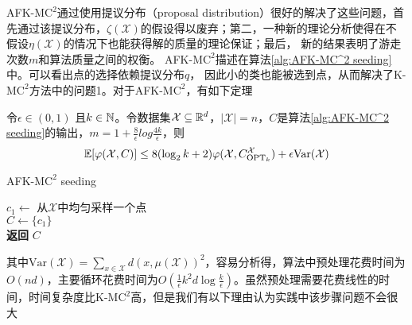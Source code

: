 AFK-M$\text{C}^2$通过使用提议分布（proposal distribution）很好的解决了这些问题，首先通过该提议分布，$\zeta(\mathcal{X})$的假设得以废弃；第二，一种新的理论分析使得在不假设$\eta(\mathcal{X})$的情况下也能获得解的质量的理论保证；最后， 新的结果表明了游走次数$m$和算法质量之间的权衡。 AFK-M$\text{C}^2$描述在算法\ref{alg:AFK-MC^2 seeding}中。可以看出点的选择依赖提议分布$q$， 因此小的类也能被选到点，从而解决了K-M$\text{C}^2$方法中的问题1。对于AFK-M$\text{C}^2$，有如下定理
\begin{theorem}
    \label{theo:AFKmc^2 performance}
    令$\epsilon \in (0,1)$ 且$k \in \mathbb{N}$。令数据集$\mathcal{X} \subseteq \mathbb{R}^d$，$|\mathcal{X}| = n$，$C$是算法\ref{alg:AFK-MC^2 seeding}的输出，$m = 1+\frac{8}{\epsilon}log \frac{4k}{\epsilon}$，则
    \begin{equation}
    \mathbb{E}[\varphi(\mathcal{X},C)]\leq 8(\log_{2}k+2)\varphi(\mathcal{X},C_{\text{OPT}_k}^{\mathcal{X}}) + \epsilon\text{Var}(\mathcal{X})
    \end{equation}
\end{theorem}
\begin{algorithm}
    \SetNoFillComment
    \caption{AFK-M$\text{C}^2$ seeding}\label{alg:AFK-MC^2 seeding}
    $c_1 \gets $ 从$\mathcal{X}$中均匀采样一个点 \\
    $C \gets \{c_1\}$ \\
    \textbf{返回} $C$
\end{algorithm}
其中$\text{Var}(\mathcal{X})=\sum_{x \in  \mathcal{X}}d(x,\mu(\mathcal{X}))^2$，容易分析得，算法中预处理花费时间为$O(nd)$，主要循环花费时间为$O(\frac{1}{\epsilon}k^2 d\log \frac{k}{\epsilon})$。虽然预处理需要花费线性的时间，时间复杂度比K-M$\text{C}^2$高，但是我们有以下理由认为实践中该步骤问题不会很大
